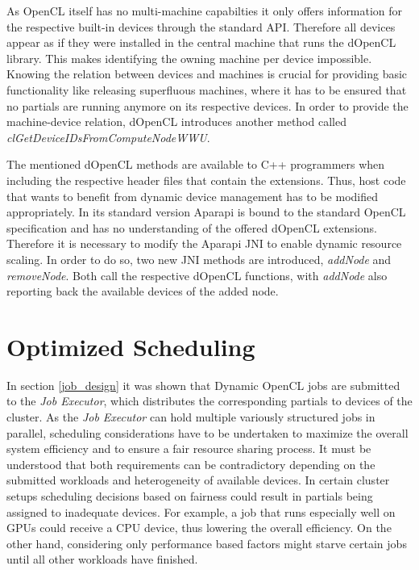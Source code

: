 As OpenCL itself has no multi-machine capabilties it only offers information for the respective built-in devices through the standard API. Therefore all devices appear as if they were installed in the central machine that runs the dOpenCL library. This makes identifying the owning machine per device impossible. Knowing the relation between devices and machines is crucial for providing basic functionality like releasing superfluous machines, where it has to be ensured that no partials are running anymore on its respective devices. In order to provide the machine-device relation, dOpenCL introduces another method called \textit{clGetDeviceIDsFromComputeNodeWWU}.

The mentioned dOpenCL methods are available to C++ programmers when including the respective header files that contain the extensions. Thus, host code that wants to benefit from dynamic device management has to be modified appropriately. In its standard version Aparapi is bound to the standard OpenCL specification and has no understanding of the offered dOpenCL extensions. Therefore it is necessary to modify the Aparapi JNI to enable dynamic resource scaling. In order to do so, two new JNI methods are introduced, \textit{addNode} and \textit{removeNode}. Both call the respective dOpenCL functions, with \textit{addNode} also reporting back the available devices of the added node.

\section{Optimized Scheduling}
\label{optimized_scheduling}
In section \ref{job_design} it was shown that Dynamic OpenCL jobs are submitted to the \textit{Job Executor}, which distributes the corresponding partials to devices of the cluster. As the \textit{Job Executor} can hold multiple variously structured jobs in parallel, scheduling considerations have to be undertaken to maximize the overall system efficiency and to ensure a fair resource sharing process. It must be understood that both requirements can be contradictory depending on the submitted workloads and heterogeneity of available devices. In certain cluster setups scheduling decisions based on fairness could result in partials being assigned to inadequate devices. For example, a job that runs especially well on GPUs could receive a CPU device, thus lowering the overall efficiency. On the other hand, considering only performance based factors might starve certain jobs until all other workloads have finished.

